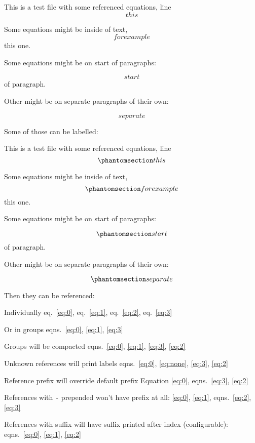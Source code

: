 This is a test file with some referenced equations, line \[ this \]

Some equations might be inside of text, \[ for example \] this one.

Some equations might be on start of paragraphs:

\[ start \] of paragraph.

Other might be on separate paragraphs of their own:

\[ separate \]

Some of those can be labelled:

This is a test file with some referenced equations, line
\begin{equation}\phantomsection\label{eq:0}{ this }\end{equation}

Some equations might be inside of text,
\begin{equation}\phantomsection\label{eq:1}{ for example }\end{equation}
this one.

Some equations might be on start of paragraphs:

\begin{equation}\phantomsection\label{eq:2}{ start }\end{equation} of
paragraph.

Other might be on separate paragraphs of their own:

\begin{equation}\phantomsection\label{eq:3}{ separate }\end{equation}

Then they can be referenced:

Individually eq.~\ref{eq:0}, eq.~\ref{eq:1}, eq.~\ref{eq:2},
eq.~\ref{eq:3}

Or in groups eqns.~\ref{eq:0}, \ref{eq:1}, \ref{eq:3}

Groups will be compacted
eqns.~\ref{eq:0}, \ref{eq:1}, \ref{eq:3}, \ref{eq:2}

Unknown references will print labels
eqns.~\ref{eq:0}, \ref{eq:none}, \ref{eq:3}, \ref{eq:2}

Reference prefix will override default prefix Equation \ref{eq:0},
eqns.~\ref{eq:3}, \ref{eq:2}

References with \texttt{-} prepended won't have prefix at all:
\ref{eq:0}, \ref{eq:1}, eqns.~\ref{eq:2}, \ref{eq:3}

References with suffix will have suffix printed after index
(configurable): eqns.~\ref{eq:0}, \ref{eq:1}, \ref{eq:2}
